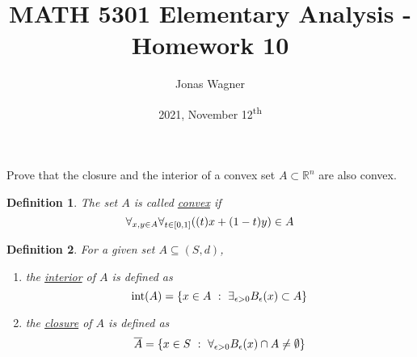 \documentclass[]{article}
\title{MATH 5301 Elementary Analysis - Homework 10}
\author{Jonas Wagner}
\date{2021, November 12\textsuperscript{th}}
\newcommand{\R}{\mathbb{R}}
\newcommand{\st}{\ : \ }
\newtheorem{definition}{Definition}
\begin{document}
\maketitle

\section{}
Prove that the closure and the interior of a convex set $A \subset \R^n$ are also convex.

\begin{definition}
    The set $A$ is called \emph{\underline{convex}} if
    \[
        \forall_{x, y \in A} \forall_{t \in [0, 1]}
        \qty((t) x + (1 - t) y) \in A
    \]
\end{definition}

\begin{definition}
    For a given set $A \subseteq (S,d)$,
    \begin{enumerate}
        \item the \emph{\underline{interior}} of $A$ is defined as
        \[
            \text{int}(A) = \qty{
                x \in A \st \exists_{\epsilon > 0} B_{\epsilon}(x) \subset A
            }
        \]
        \item the \emph{\underline{closure}} of $A$ is defined as
        \[
            \overline{A} = \qty{
                x \in S \st \forall_{\epsilon > 0} B_\epsilon(x) \cap A \neq \emptyset
            }
        \]
    \end{enumerate}
\end{definition}
\end{document}
